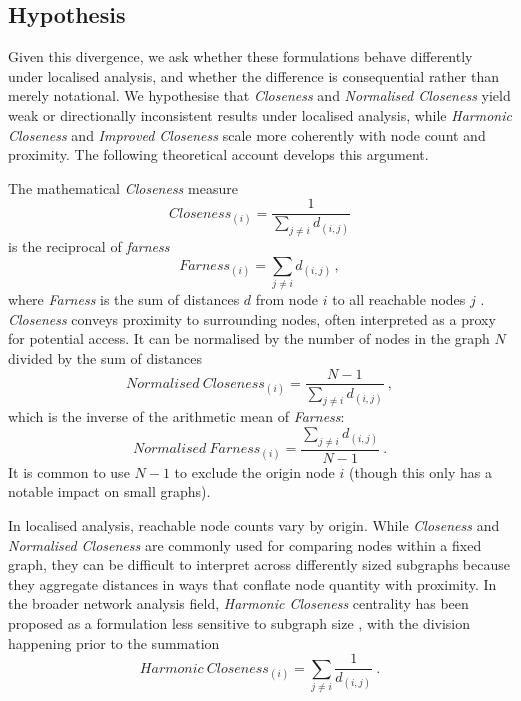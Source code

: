 \begin{table}[htbp]
  \label{table:closeness_literature}
\end{table}

\subsection{Hypothesis}

Given this divergence, we ask whether these formulations behave differently under localised analysis, and whether the difference is consequential rather than merely notational. We hypothesise that \emph{Closeness} and \emph{Normalised Closeness} yield weak or directionally inconsistent results under localised analysis, while \emph{Harmonic Closeness} and \emph{Improved Closeness} scale more coherently with node count and proximity. The following theoretical account develops this argument.

The mathematical \emph{Closeness} measure
\begin{equation}\label{eq:closeness}
  Closeness_{(i)} = \frac{1}{\sum_{j\neq{i}}d_{(i,j)}}
\end{equation}
is the reciprocal of \emph{farness}
\begin{equation}\label{eq:farness}
  Farness_{(i)} = \sum_{j\neq{i}}d_{(i,j)}\, ,
\end{equation}
where \emph{Farness} is the sum of distances $d$ from node $i$ to all reachable nodes $j$ \cite{Sabidussi1966}. \emph{Closeness} conveys proximity to surrounding nodes, often interpreted as a proxy for potential access. It can be normalised by the number of nodes in the graph $N$ divided by the sum of distances
\begin{equation}\label{eq:normalised_closeness}
  Normalised\ Closeness_{(i)} = \frac{N-1}{\sum_{j\neq{i}}d_{(i,j)}}\ ,
\end{equation}
which is the inverse of the arithmetic mean of \emph{Farness}:
\begin{equation}\label{eq:normalised_farness}
  Normalised\ Farness_{(i)} = \frac{\sum_{j\neq{i}}d_{(i,j)}}{N-1}\ .
\end{equation}
It is common to use $N-1$ to exclude the origin node $i$ (though this only has a notable impact on small graphs).

In localised analysis, reachable node counts vary by origin. While \emph{Closeness} and \emph{Normalised Closeness} are commonly used for comparing nodes within a fixed graph, they can be difficult to interpret across differently sized subgraphs because they aggregate distances in ways that conflate node quantity with proximity. In the broader network analysis field, \emph{Harmonic Closeness} centrality has been proposed as a formulation less sensitive to subgraph size \cite{Beauchamp1965, Marchiori2000, Dekker2005, Rochat2009}, with the division happening prior to the summation
\begin{equation}\label{eq:harmonic_closeness}
  Harmonic\ Closeness_{(i)} = \sum_{j\neq{i}}\frac{1}{d_{(i,j)}}\ .
\end{equation}

